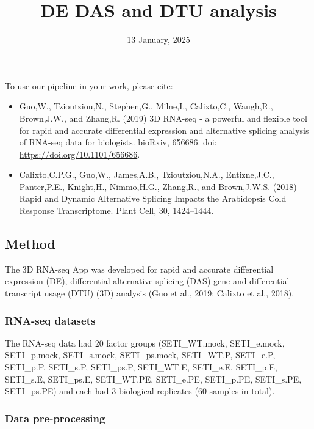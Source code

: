 \documentclass[]{article}
\title{DE DAS and DTU analysis}
\author{}
\date{\vspace{-2.5em}13 January, 2025}
\providecommand{\tightlist}{%
  \setlength{\itemsep}{0pt}\setlength{\parskip}{0pt}}
\begin{document}
\maketitle

{
\setcounter{tocdepth}{4}
\tableofcontents
}
To use our pipeline in your work, please cite:

\begin{itemize}
\tightlist
\item
  Guo,W., Tzioutziou,N., Stephen,G., Milne,I., Calixto,C., Waugh,R.,
  Brown,J.W., and Zhang,R. (2019) 3D RNA-seq - a powerful and flexible
  tool for rapid and accurate differential expression and alternative
  splicing analysis of RNA-seq data for biologists. bioRxiv, 656686.
  doi: \url{https://doi.org/10.1101/656686}.
\item
  Calixto,C.P.G., Guo,W., James,A.B., Tzioutziou,N.A., Entizne,J.C.,
  Panter,P.E., Knight,H., Nimmo,H.G., Zhang,R., and Brown,J.W.S. (2018)
  Rapid and Dynamic Alternative Splicing Impacts the Arabidopsis Cold
  Response Transcriptome. Plant Cell, 30, 1424--1444.
\end{itemize}

\subsection{Method}\label{method}

The 3D RNA-seq App was developed for rapid and accurate differential
expression (DE), differential alternative splicing (DAS) gene and
differential transcript usage (DTU) (3D) analysis (Guo et al., 2019;
Calixto et al., 2018).

\subsubsection{RNA-seq datasets}\label{rna-seq-datasets}

The RNA-seq data had 20 factor groups (SETI\_WT.mock, SETI\_e.mock,
SETI\_p.mock, SETI\_s.mock, SETI\_ps.mock, SETI\_WT.P, SETI\_e.P,
SETI\_p.P, SETI\_s.P, SETI\_ps.P, SETI\_WT.E, SETI\_e.E, SETI\_p.E,
SETI\_s.E, SETI\_ps.E, SETI\_WT.PE, SETI\_e.PE, SETI\_p.PE, SETI\_s.PE,
SETI\_ps.PE) and each had 3 biological replicates (60 samples in total).

\subsubsection{Data pre-processing}\label{data-pre-processing}
\end{document}
